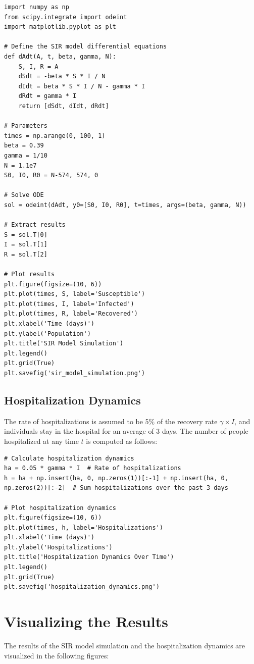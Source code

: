 \documentclass{article}
\begin{document}
\begin{verbatim}
import numpy as np
from scipy.integrate import odeint
import matplotlib.pyplot as plt

# Define the SIR model differential equations
def dAdt(A, t, beta, gamma, N):
    S, I, R = A
    dSdt = -beta * S * I / N
    dIdt = beta * S * I / N - gamma * I
    dRdt = gamma * I
    return [dSdt, dIdt, dRdt]

# Parameters
times = np.arange(0, 100, 1)
beta = 0.39
gamma = 1/10
N = 1.1e7
S0, I0, R0 = N-574, 574, 0

# Solve ODE
sol = odeint(dAdt, y0=[S0, I0, R0], t=times, args=(beta, gamma, N))

# Extract results
S = sol.T[0]
I = sol.T[1]
R = sol.T[2]

# Plot results
plt.figure(figsize=(10, 6))
plt.plot(times, S, label='Susceptible')
plt.plot(times, I, label='Infected')
plt.plot(times, R, label='Recovered')
plt.xlabel('Time (days)')
plt.ylabel('Population')
plt.title('SIR Model Simulation')
plt.legend()
plt.grid(True)
plt.savefig('sir_model_simulation.png')
\end{verbatim}

\subsection{Hospitalization Dynamics}
The rate of hospitalizations is assumed to be 5\% of the recovery rate \( \gamma \times I \), and individuals stay in the hospital for an average of 3 days. The number of people hospitalized at any time \( t \) is computed as follows:

\begin{verbatim}
# Calculate hospitalization dynamics
ha = 0.05 * gamma * I  # Rate of hospitalizations
h = ha + np.insert(ha, 0, np.zeros(1))[:-1] + np.insert(ha, 0, np.zeros(2))[:-2]  # Sum hospitalizations over the past 3 days

# Plot hospitalization dynamics
plt.figure(figsize=(10, 6))
plt.plot(times, h, label='Hospitalizations')
plt.xlabel('Time (days)')
plt.ylabel('Hospitalizations')
plt.title('Hospitalization Dynamics Over Time')
plt.legend()
plt.grid(True)
plt.savefig('hospitalization_dynamics.png')
\end{verbatim}

\section{Visualizing the Results}
The results of the SIR model simulation and the hospitalization dynamics are visualized in the following figures:
\end{document}
